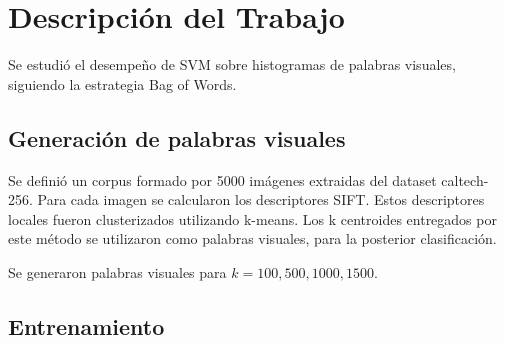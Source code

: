 \documentclass[12pt]{article}
\begin{document}
\section{Descripción del Trabajo}

Se estudió el desempeño de SVM sobre histogramas de palabras visuales, siguiendo la estrategia Bag of Words.

\subsection{Generación de palabras visuales}

Se definió un corpus formado por 5000 imágenes extraidas del dataset caltech-256. Para cada imagen se calcularon los descriptores SIFT.
Estos descriptores locales fueron clusterizados utilizando k-means. Los k centroides entregados por este método se utilizaron como
palabras visuales, para la posterior clasificación.

Se generaron palabras visuales para $k = 100, 500, 1000, 1500$.

\subsection{Entrenamiento}
\end{document}
